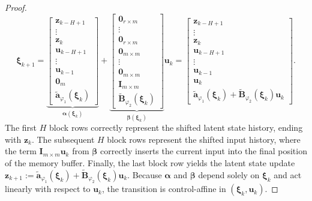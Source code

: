 \documentclass[10pt,a4paper]{amsart}
\begin{document}
\begin{proof}
\begin{equation}
\boldsymbol{\xi}_{k+1} =
\underbrace{\begin{bmatrix} \mathbf{z}_{k-H+1} \\ \vdots \\ \mathbf{z}_{k} \\ \mathbf{u}_{k-H+1} \\ \vdots \\ \mathbf{u}_{k-1} \\ \mathbf{0}_m \\ \widetilde{\mathbf{a}}_{\varphi_1}(\boldsymbol{\xi}_k) \end{bmatrix}}_{\boldsymbol{\alpha}(\boldsymbol{\xi}_k)}
+
\underbrace{\begin{bmatrix} \mathbf{0}_{r \times m} \\ \vdots \\ \mathbf{0}_{r \times m} \\ \mathbf{0}_{m \times m} \\ \vdots \\ \mathbf{0}_{m \times m} \\ \mathbf{I}_{m \times m} \\ \widetilde{\mathbf{B}}_{\varphi_2}(\boldsymbol{\xi}_k) \end{bmatrix}}_{\boldsymbol{\beta}(\boldsymbol{\xi}_k)} \mathbf{u}_k
=
\begin{bmatrix} \mathbf{z}_{k-H+1} \\ \vdots \\ \mathbf{z}_{k} \\ \mathbf{u}_{k-H+1} \\ \vdots \\ \mathbf{u}_{k-1} \\ \mathbf{u}_k \\ \widetilde{\mathbf{a}}_{\varphi_1}(\boldsymbol{\xi}_k) + \widetilde{\mathbf{B}}_{\varphi_2}(\boldsymbol{\xi}_k)\mathbf{u}_k \end{bmatrix}.
\end{equation}
The first $H$ block rows correctly represent the shifted latent state history, ending with $\mathbf{z}_k$. The subsequent $H$ block rows represent the shifted input history, where the term $\mathbf{I}_{m \times m} \mathbf{u}_k$ from $\boldsymbol{\beta}$ correctly inserts the current input into the final position of the memory buffer. Finally, the last block row yields the latent state update $\mathbf{z}_{k+1} := \widetilde{\mathbf{a}}_{\varphi_1}(\boldsymbol{\xi}_k) + \widetilde{\mathbf{B}}_{\varphi_2}(\boldsymbol{\xi}_k)\mathbf{u}_k$. Because $\boldsymbol{\alpha}$ and $\boldsymbol{\beta}$ depend solely on $\boldsymbol{\xi}_k$ and act linearly with respect to $\mathbf{u}_k$, the transition is control-affine in $(\boldsymbol{\xi}_k, \mathbf{u}_k)$.
\end{proof}
\end{document}
